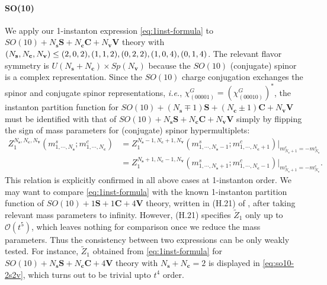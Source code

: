 \documentclass[letterpaper, 11pt]{article}
\newcommand{\nn}{\nonumber}
\begin{document}
{\paragraph{SO(10)}
We apply our 1-instanton expression \eqref{eq:1inst-formula} to $SO(10) + N_{\mathbf s}\mathbf{S} + N_{\mathbf c}\mathbf{C} + N_{\mathbf v}\mathbf{V}$ theory with $( N_{\bf s},  N_{\bf c}, N_{\bf v}) \leq (2,0,2),(1,1,2), (0,2,2),(1,0,4),(0,1,4)$. The relevant flavor symmetry is $U(N_\mathbf{s} + N_\mathbf{c}) \times Sp(N_\mathbf{v})$ because  the $SO(10)$ (conjugate) spinor is a complex representation. Since the $SO(10)$ charge conjugation exchanges the spinor and conjugate spinor representations, 
\textit{i.e.}, $\chi_{(00001)}^G = (\chi_{(00010)}^G)^*$, the instanton partition function for $SO(10) + (N_{\mathbf s}\mp 1)\mathbf{S} + (N_{\mathbf c}\pm 1)\mathbf{C} + N_{\mathbf v}\mathbf{V}$  must be identified with that of $SO(10) + N_{\mathbf s}\mathbf{S} + N_{\mathbf c}\mathbf{C} + N_{\mathbf v}\mathbf{V}$ simply by flipping the sign of mass parameters for (conjugate) spinor hypermultiplets: 
\begin{align}
Z_{1}^{N_{\mathbf{s}},N_\mathbf{c},N_{\mathbf{v}}}(m^s_{1, \cdots, N_\mathbf{s}}; m^c_{1,\cdots,N_\mathbf{c}}) &= Z_{1}^{N_{\mathbf{s}}-1,N_\mathbf{c}+1,N_{\mathbf{v}}}(m^s_{1, \cdots, N_\mathbf{s}-1}; m^c_{1,\cdots,N_\mathbf{c}+1})\big|_{m^c_{N_\mathbf{c}+1} = -m^s_{N_\mathbf{s}}}\nn\\ 
  &= Z_{1}^{N_{\mathbf{s}}+1,N_\mathbf{c}-1,N_{\mathbf{v}}}(m^s_{1, \cdots, N_\mathbf{s}+1}; m^c_{1,\cdots,N_\mathbf{c}-1})\big|_{m^s_{N_\mathbf{s}+1} = -m^c_{N_\mathbf{c}}}.
\end{align}
This relation is explicitly confirmed in all above cases at 1-instanton order. 
We may want to compare \eqref{eq:1inst-formula} with the known 1-instanton partition function of $SO(10) + 1\mathbf{S} + 1\mathbf{C} + 4\mathbf{V}$ theory, written in (H.21) of \cite{DelZotto:2018tcj}, after taking relevant mass parameters  to infinity. However, (H.21) specifies $\tilde{Z}_1$ only up to $\mathcal{O}(t^5)$, which leaves nothing for comparison once we reduce the mass parameters. Thus the consistency between two expressions can be only weakly tested. For instance, $\tilde{Z}_{1}$ obtained from \eqref{eq:1inst-formula} for $SO(10) + N_\mathbf{s}\mathbf{S}+ N_\mathbf{c}\mathbf{C} + 4\mathbf{V}$ theory with $ N_\mathbf{s} 
+ N_\mathbf{c} = 2$ is displayed in \eqref{eq:so10-2s2v}, which turns out to be trivial upto $t^4$ order.



}
\end{document}
